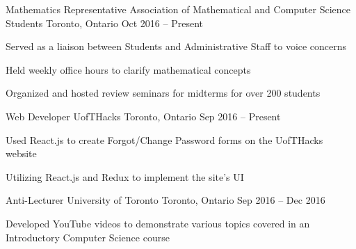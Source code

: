 \begin{cventries}
  \cventry
    {Mathematics Representative}
    {Association of Mathematical and Computer Science Students}
    {Toronto, Ontario}
    {Oct 2016 -- Present}
    {
      \begin{cvitems}
        \item {Served as a liaison between Students and Administrative Staff to voice concerns}
        \item {Held weekly office hours to clarify mathematical concepts}
        \item {Organized and hosted review seminars for midterms for over 200 students}
      \end{cvitems}
    }
    \cventry
    {Web Developer}
    {UofTHacks}
    {Toronto, Ontario}
    {Sep 2016 -- Present}
    {
      \begin{cvitems}
        \item {Used React.js to create Forgot/Change Password forms on the UofTHacks website}
        \item {Utilizing React.js and Redux to implement the site's UI}
      \end{cvitems}
    }
\cventry
    {Anti-Lecturer}
    {University of Toronto}
    {Toronto, Ontario}
    {Sep 2016 -- Dec 2016}
    {
      \begin{cvitems}
        \item {Developed YouTube videos to demonstrate various topics covered in an Introductory Computer Science course}
      \end{cvitems}
    }
\end{cventries}
